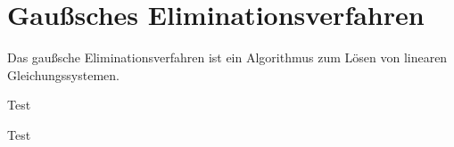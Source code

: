 \section{Gaußsches Eliminationsverfahren}
Das gaußsche Eliminationsverfahren ist ein Algorithmus zum Lösen von linearen Gleichungssystemen.

\begin{procedure}
  Test
\end{procedure}


\begin{procedure}
  Test
\end{procedure}
